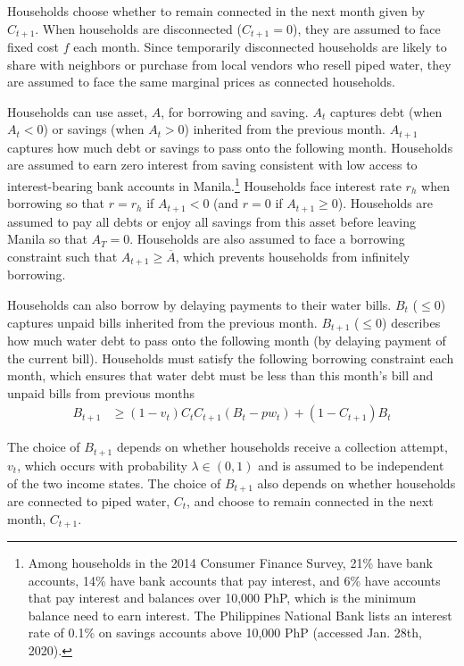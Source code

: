 \documentclass[12pt]{article}
\begin{document}
Households choose whether to remain connected in the next month given by $C_{t+1}$.  When households are disconnected ($C_{t+1}=0$), they are assumed to face fixed cost $f$ each month.  Since temporarily disconnected households are likely to share with neighbors or purchase from local vendors who resell piped water, they are assumed to face the same marginal prices as connected households.

Households can use asset, $A$, for borrowing and saving.  $A_t$ captures debt (when $A_t<0$) or savings (when $A_t>0$) inherited from the previous month.  $A_{t+1}$ captures how much debt or savings to pass onto the following month.  Households are assumed to earn zero interest from saving consistent with low access to interest-bearing bank accounts in Manila.\footnote{Among households in the 2014 Consumer Finance Survey, 21\% have bank accounts, 14\% have bank accounts that pay interest, and 6\% have accounts that pay interest and balances over 10,000 PhP, which is the minimum balance need to earn interest.  The Philippines National Bank lists an interest rate of 0.1\% on savings accounts above 10,000 PhP (accessed Jan. 28th, 2020).} Households face interest rate $r_h$ when borrowing so that  $r=r_h$ if $A_{t+1}<0$ (and $r = 0$ if $A_{t+1}\geq 0$).  Households are assumed to pay all debts or enjoy all savings from this asset before leaving Manila so that $A_{T}=0$.  Households are also assumed to face a borrowing constraint such that $A_{t+1}\geq\overline{A}$, which prevents households from infinitely borrowing.

Households can also borrow by delaying payments to their water bills.  $B_t$ ($\leq0$) captures unpaid bills inherited from the previous month.  $B_{t+1}$ ($\leq0$) describes how much water debt to pass onto the following month (by delaying payment of the current bill).  Households must satisfy the following borrowing constraint each month, which ensures that water debt must be less than this month's bill and unpaid bills from previous months
\begin{align}\label{eq:borrowingconstraint}
B_{t+1} &\geq (1-v_t)  C_{t} C_{t+1} (B_t -pw_t) + (1-C_{t+1})B_t 
\end{align}


The choice of $B_{t+1}$ depends on whether households receive a collection attempt, $v_t$, which occurs with probability $\lambda \in (0,1)$ and is assumed to be independent of the two income states.  The choice of $B_{t+1}$ also depends on whether households are connected to piped water, $C_t$, and choose to remain connected in the next month, $C_{t+1}$.  
\end{document}

